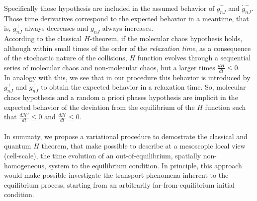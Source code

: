 Specifically those hypothesis are included in the assumed behavior of $\dot{g}_{nJ}^{+}$ and $\dot{g}_{nJ}^{-}$. 
Those time derivatives correspond to the expected behavior in a meantime, that 
is, $\dot{g}_{nJ}^{+}$ always decreases and $\dot{g}_{nJ}^{-}$ always increases.\\ 
According to the classical $H$-theorem, if the molecular chaos hypothesis holds, 
although within small times of the order of the \textit{relaxation time}, as a consequence of the 
stochastic nature of the collisions, $H$ function evolves through a sequential series of 
molecular chaos and non-molecular chaos, but a larger times $\frac{dH}{dt}\leq 0$.\\
In analogy with this, we see that in our procedure this behavior is introduced by 
$\dot{g}_{nJ}^{+}$ and $\dot{g}_{nJ}^{-}$ to obtain the expected behavior in a relaxation time. 
So, molecular chaos hypothesis and a random a priori phases hypothesis are implicit
 in the expected behavior of the deviation from the equilibrium of the $H$ function such that 
$\frac{d\mathcal{H}'}{dt}\leq 0$ and $\frac{d\mathcal{H}}{dt}\leq 0$.
\\
\\
In summaty, we propose a variational procedure to demostrate the classical and quantum $H$ theorem, that
make possible to describe at a mesoscopic local view (cell-scale), the time evolution 
of an out-of-equilibrium, spatially non-homogeneous, system to the equilibrium condition.
In principle, this approach would make possible investigate the transport phenomena inherent to the
equilibrium process, starting from an arbitrarily far-from-equilibrium initial condition.


